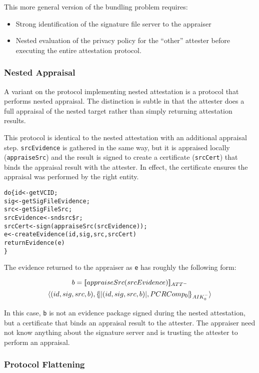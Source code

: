 \documentclass[10pt]{article}
\begin{document}
This more general version of the bundling problem requires:

\begin{itemize}
  \parskip=0pt\itemsep=0pt
\item Strong identification of the signature file server to the appraiser
\item Nested evaluation of the privacy policy for the ``other''
  attester before executing the entire attestation
  protocol.
\end{itemize}

\subsubsection*{Nested Appraisal}

A variant on the protocol implementing nested attestation is a
protocol that performs nested appraisal.  The distinction is subtle in
that the attester does a full appraisal of the nested target rather
than simply returning attestation results.

This protocol is identical to the nested attestation with an
additional appraisal step.  \Verb+srcEvidence+ is gathered in the same
way, but it is appraised locally (\Verb+appraiseSrc+) and the result
is signed to create a certificate (\Verb+srcCert+) that binds the
appraisal result with the attester.  In effect, the certificate
ensures the appraisal was performed by the right entity.

\begin{alltt}
  do \{ id <- getVCID;
       sig <- getSigFileEvidence;
       src <- getSigFileSrc;
       srcEvidence <- snd src \$ r;
       srcCert <- sign(appraiseSrc(srcEvidence));
       e <- createEvidence(id,sig,src,srcCert)
       returnEvidence(e)
  \}
\end{alltt}

The evidence returned to the appraiser as \Verb+e+ has roughly the
following form:

\[b=[\![appraiseSrc(srcEvidence)]\!]_{ATT^{-}}\]
\[\langle (id,sig,src,b),\{\!\lvert \lvert (id,sig,src,b) \rvert,PCRComp_0\rvert\!\}_{AIK_0^{-}}\rangle\]

In this case, \Verb+b+ is not an evidence package signed during the
nested attestation, but a certificate that binds an appraisal result
to the attester.  The appraiser need not know anything about the
signature server and is trusting the attester to perform an
appraisal.

\subsubsection*{Protocol Flattening}
\end{document}
